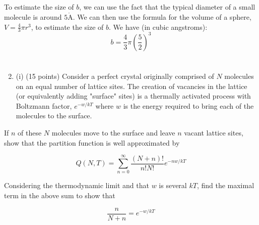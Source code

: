 \documentclass[12pt]{article}
\def\AA{\mathring{\mathrm{A}}}
\begin{document}
\subsection{}
To estimate the size of $b$, we can use the fact that the typical diameter of a small molecule is around $5 \AA$. We can then use the formula for the volume of a sphere, $V = \frac{4}{3}\pi r^3$, to estimate the size of $b$. We have (in cubic angstroms):
\begin{equation}
  b = \frac{4}{3}\pi \left(\frac{5}{2}\right)^3
\end{equation}
\section{}
\begin{enumerate}
  \setcounter{enumi}{1}
  \item (i) (15 points) Consider a perfect crystal originally comprised of $N$ molecules on an equal number of lattice sites. The creation of vacancies in the lattice (or equivalently adding "surface" sites) is a thermally activated process with Boltzmann factor, $e^{-w / k T}$ where $w$ is the energy required to bring each of the molecules to the surface.
\end{enumerate}

If $n$ of these $N$ molecules move to the surface and leave $n$ vacant lattice sites, show that the partition function is well approximated by

$$
Q(N, T)=\sum_{n=0}^{\infty} \frac{(N+n) !}{n ! N !} e^{-n w / k T}
$$

Considering the thermodynamic limit and that $w$ is several $k T$, find the maximal term in the above sum to show that

$$
\frac{n}{N+n}=e^{-w / k T}
$$
\end{document}
